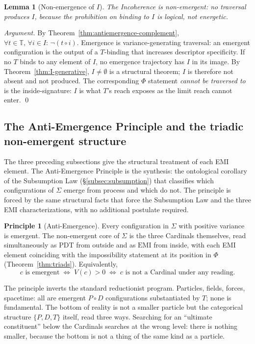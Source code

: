 \documentclass[11pt,a4paper]{article}
\newtheorem{lemma}[theorem]{Lemma}
\theoremstyle{definition}
\newtheorem{principle}[theorem]{Principle}
\theoremstyle{remark}
\begin{document}
\begin{lemma}[Non-emergence of $I$]\label{lem:emergent-I}
The Incoherence is non-emergent: no traversal produces $I$, because the prohibition on binding to $I$ is logical, not energetic.
\end{lemma}

\begin{proof}[Argument]
By Theorem~\ref{thm:antiemergence-complement}, $\forall t \in \mathbb{T},\,\forall i \in I :\, \neg(t \circ i)$. Emergence is variance-generating traversal: an emergent configuration is the output of a $T$-binding that increases descriptor specificity. If no $T$ binds to any element of $I$, no emergence trajectory has $I$ in its image. By Theorem~\ref{thm:I-generative}, $I \neq \emptyset$ is a structural theorem; $I$ is therefore not absent and not produced. The corresponding $\Phi$ statement \emph{cannot be traversed to} is the inside-signature: $I$ is what $T$'s reach exposes as the limit reach cannot enter. \qed
\end{proof}

\subsection{The Anti-Emergence Principle and the triadic non-emergent structure}\label{subsec:antiemergence}

The three preceding subsections give the structural treatment of each EMI element. The Anti-Emergence Principle is the synthesis: the ontological corollary of the Subsumption Law (\S\ref{subsec:subsumption}) that classifies which configurations of $\Sigma$ emerge from process and which do not. The principle is forced by the same structural facts that force the Subsumption Law and the three EMI characterizations, with no additional postulate required.

\begin{principle}[Anti-Emergence]\label{princ:antiemergence}
Every configuration in $\Sigma$ with positive variance is emergent. The non-emergent core of $\Sigma$ is the three Cardinals themselves, read simultaneously as $\mathrm{PDT}$ from outside and as $\mathrm{EMI}$ from inside, with each EMI element coinciding with the impossibility statement at its position in $\Phi$ (Theorem~\ref{thm:triads}). Equivalently,
\[
c \text{ is emergent} \;\Longleftrightarrow\; V(c) > 0 \;\Longleftrightarrow\; c \text{ is not a Cardinal under any reading.}
\]
\end{principle}

The principle inverts the standard reductionist program. Particles, fields, forces, spacetime: all are emergent $P\circ D$ configurations substantiated by $T$; none is fundamental. The bottom of reality is not a smaller particle but the categorical structure $\{P,D,T\}$ itself, read three ways. Searching for an ``ultimate constituent'' below the Cardinals searches at the wrong level: there is nothing smaller, because the bottom is not a thing of the same kind as a particle.
\end{document}

